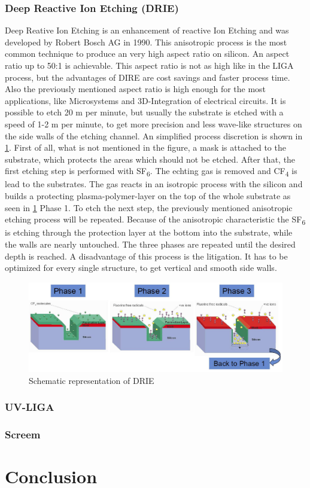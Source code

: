 \documentclass[a4paper,
  twoside, %
  headlines=2.1 %
  ]{scrartcl}
\begin{document}
\subsubsection{Deep Reactive Ion Etching (DRIE)}
Deep Reative Ion Etching is an enhancement of reactive Ion Etching and was developed by Robert Bosch AG in 1990. This anisotropic process is the most common technique to produce an very high aspect ratio on silicon. An aspect ratio up to 50:1 is achievable. This aspect ratio is not as high like in the LIGA process, but the advantages of DIRE are cost savings and faster process time. Also the previously mentioned aspect ratio is high enough for the most applications, like  Microsystems and 3D-Integration of electrical circuits. It is possible to etch 20 \textmu m per minute, but usually the substrate is etched with a speed of 1-2 \textmu m per minute, to get more precision and less wave-like structures on the side walls of the etching channel. An simplified process discretion is shown in \cref{Schematic_drie}. First of all, what is not mentioned in the figure, a mask is attached to the substrate, which protects the areas which should not be etched. After that, the first etching step is performed with SF\textsubscript{6}. The echting gas is removed and CF\textsubscript{4} is lead to the substrates. The gas reacts in an isotropic process with the silicon and builds a protecting plasma-polymer-layer on the top of the whole substrate as seen in \cref{Schematic_drie} Phase 1. To etch the next step, the previously mentioned anisotropic etching process will be repeated. Because of the anisotropic characteristic the SF\textsubscript{6} is etching through the protection layer at the bottom into the substrate, while the walls are nearly untouched. The three phases are repeated until the desired depth is reached. A disadvantage of this process is the litigation. It has to be optimized for every single structure, to get vertical and smooth side walls\cite{menz2005paul}.

\begin{figure}[h]
	\centering
	\includegraphics[width=\textwidth]{Graphics/DIRE/drie-schema_fraunhofer.jpg}
	\caption{Schematic representation of DRIE \cite{Fraunhofer2019}}
	\centering
	\label{Schematic_drie}
\end{figure} 
\subsubsection{UV-LIGA}
\subsubsection{Screem}

\section{Conclusion}

\clearpage


\end{document}
